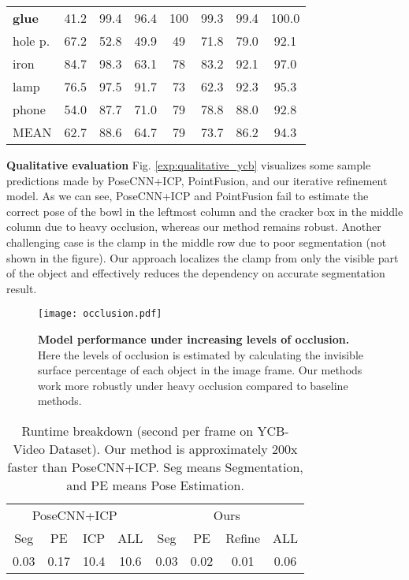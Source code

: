 \documentclass[10pt,twocolumn,letterpaper]{article}
\begin{document}
\begin{table*}
\begin{tabular}{l|c|c|c|c|c|c|c}
\textbf{glue} & 41.2 & 99.4 & 96.4 & 100 & 99.3 & 99.4 & 100.0 \\
hole p. & 67.2 & 52.8 & 49.9 & 49 & 71.8 & 79.0 & 92.1 \\
iron & 84.7 & 98.3 & 63.1 & 78 & 83.2 & 92.1 & 97.0 \\
lamp & 76.5 & 97.5 & 91.7 & 73 & 62.3 & 92.3 & 95.3 \\
phone & 54.0 & 87.7 & 71.0 & 79 & 78.8 & 88.0 & 92.8 \\ \hline
MEAN & 62.7 & 88.6 & 64.7 & 79 & 73.7 & 86.2 & 94.3 \\ \hline
\end{tabular}
\label{exp:LineMOD}
\vspace{-10pt}
\end{table*}

\noindent\textbf{Qualitative evaluation} 
Fig. \ref{exp:qualitative_ycb} visualizes some sample predictions made by PoseCNN+ICP, PointFusion, and our iterative refinement model. As we can see, PoseCNN+ICP and PointFusion fail to estimate the correct pose of the bowl in the leftmost column and the cracker box in the middle column due to heavy occlusion, whereas our method remains robust. Another challenging case is the clamp in the middle row due to poor segmentation (not shown in the figure). Our approach localizes the clamp from only the visible part of the object and effectively reduces the dependency on accurate segmentation result.

\begin{figure}[t]
	\centering
	\texttt{[image: occlusion.pdf]}
	\caption{\textbf{Model performance under increasing levels of occlusion.} Here the levels of occlusion is estimated by calculating the invisible surface percentage of each object in the image frame. Our methods work more robustly under heavy occlusion compared to baseline methods.}
	\label{fig:exp_occlusion2}
\end{figure}

\begin{table}
\small
\centering
\caption{Runtime breakdown (second per frame on YCB-Video Dataset). Our method is approximately 200x faster than PoseCNN+ICP. Seg means Segmentation, and PE means Pose Estimation.}
\begin{tabular}{cccc|cccc}
\hline
\multicolumn{4}{c|}{PoseCNN+ICP~\cite{xiang2017posecnn}} &
\multicolumn{4}{c}{Ours}\\
 \multicolumn{1}{c}{Seg}        & \multicolumn{1}{c}{PE}        & \multicolumn{1}{c}{ICP} & ALL & \multicolumn{1}{c}{Seg}   & \multicolumn{1}{c}{PE}    & \multicolumn{1}{c}{Refine} & ALL       \\ \hline
\multicolumn{1}{c}{0.03}       & \multicolumn{1}{c}{0.17}       &  \multicolumn{1}{c}{10.4} & 10.6 & \multicolumn{1}{c}{0.03} & \multicolumn{1}{c}{0.02} & \multicolumn{1}{c}{0.01} & 0.06\\ \hline
\end{tabular}
\label{exp:speed}
\end{table}
\end{document}
